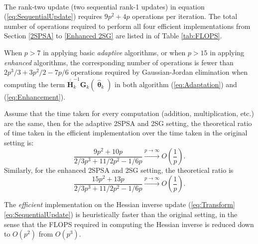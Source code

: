 \documentclass[conference,10.6cpt]{IEEEtran}
\newcommand{\bG}{\bm{G}}
\newcommand{\ooH}{\bm{\overline{\overline{H}}}}
\newcommand{\htheta}{\bm{\hat{\uptheta}}}
\begin{document}
\begin{table} [!hbp] \centering 
	\\[5pt]
		\caption{FLOPS Required in Eq. (\ref{eq:Transform}\text{--}\ref{eq:SequentialUpdate})  }
		\label{tab:FLOPS}
	\end{table}

The rank-two update (two sequential rank-1 updates) in
equation (\ref{eq:SequentialUpdate}) requires $9p^2 + 4p$ operations
per iteration. The total number of operations required to perform all four
efficient implementations from Section \ref{2SPSA} to \ref{Enhanced
  2SG} are listed in of Table \ref{tab:FLOPS}.

When $p>7$ in
applying basic \textit{adaptive} algorithms, or when $p>15$ in applying \textit{enhanced} algorithms, the corresponding number
of operations is fewer than $2p^3/3+3p^2/2-7p/6$ operations required
by Gaussian-Jordan elimination when computing the term $\ooH_k^{-1}
\bG_k(\htheta_k)$ in both algorithm (\ref{eq:Adaptation}) and
(\ref{eq:Enhancement}).

Assume that the time taken for every computation (addition, multiplication, etc.) are the same, then for the adaptive 2SPSA and 2SG setting, the theoretical ratio of time taken in the efficient implementation over the time taken in the original setting is:
\begin{equation} \label{eq:ratio1}
\frac{9p^2+10p}{2/3p^3+11/2p^2-1/6p} \overset{p \to \infty}{\longrightarrow} O(\frac{1}{p}).
\end{equation}
Similarly, for the enhanced 2SPSA and 2SG setting, the theoretical ratio is
\begin{equation}\label{eq:ratio2}
\frac{15p^2+13p}{2/3p^3+11/2p^2-1/6p} \overset{p \to \infty}{\longrightarrow} O(\frac{1}{p}).
\end{equation}

The \textit{efficient} implementation on the Hessian inverse update (\ref{eq:Transform}\text{--}\ref{eq:SequentialUpdate}) is heuristically faster than the original setting, in the sense that the FLOPS required in computing the Hessian inverse is reduced down to $O(p^2)$ from $O(p^3)$.
\end{document}
